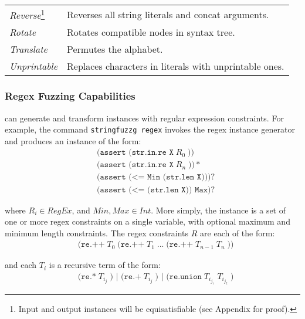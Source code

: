 \begin{table}[t]
\begin{subtable}{1\textwidth}
\begin{tabular}{l l}
            \textit{Reverse}\footnote{Input and output 
            instances will be equisatisfiable (see Appendix for proof).}
            & Reverses all string literals and concat arguments.\\
            \textit{Rotate}
            & Rotates compatible nodes in syntax tree.\\
            \textit{Translate}\footnotemark[4]
            & Permutes the alphabet.\\
            \textit{Unprintable}
            & Replaces characters in literals with unprintable ones.\\
            \bottomrule
        \end{tabular}
    \end{subtable}
\end{table}

\subsubsection{Regex Fuzzing Capabilities}
\fuzzer{} can generate
and transform instances with regular expression constraints. For example, the
command \texttt{stringfuzzg regex} invokes the regex instance
generator and produces an instance of the form:
\begin{align*}
    & \texttt{(assert (str.in.re X}\; R_0\; \texttt{))} \\
    & \texttt{(assert (str.in.re X}\; R_n\; \texttt{))}* \\
    & \texttt{(assert (<= Min (str.len X)))}? \\
    & \texttt{(assert (<= (str.len X)) Max)}?
\end{align*}

where $R_i \in RegEx$, and $Min, Max \in Int$. More simply, the
instance is a set of one or more regex constraints on a single
variable, with optional maximum and minimum length constraints. The
regex constraints $R$ are each of the form:
\begin{align*}
    & \texttt{(re.++}\; T_0\; \texttt{(re.++}\; T_1\;
    \texttt{...}\; \texttt{(re.++}\; T_{n-1}\; T_n\; \texttt{))}
\end{align*}

and each $T_i$ is a recursive term of the form:
\begin{align*}
    & \texttt{(re.*}\; T_{i_j}\; \texttt{) | (re.+}\; T_{i_j}\;
    \texttt{) | (re.union}\; T_{i_{j_1}}\; T_{i_{j_2}}\; \texttt{)}
\end{align*}

